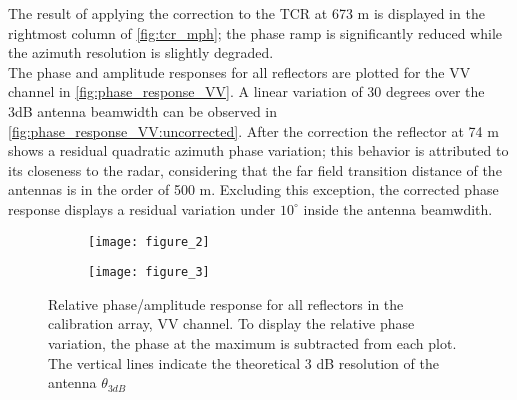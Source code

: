 The result of applying the correction to the TCR at 673 m is displayed in the rightmost column of \autoref{fig:tcr_mph}; the phase ramp is significantly reduced while the azimuth resolution is slightly degraded.\\
The phase and amplitude responses for all reflectors are plotted for the VV channel in \autoref{fig:phase_response_VV}. A linear variation of 30 degrees over the 3dB antenna beamwidth can be observed in \autoref{fig:phase_response_VV:uncorrected}. After the correction the reflector at 74 m shows a residual quadratic azimuth phase variation; this behavior is attributed to its closeness to the radar, considering that the far field transition distance of the antennas is in the order of 500 m. Excluding this exception, the corrected phase response displays a residual variation under $10^\circ$ inside the antenna beamwdith.
\begin{figure}[ht]
	\begin{subfigure}[t]{\columnwidth}
		\texttt{[image: figure\_2]}
		\label{fig:phase_response_VV:uncorrected}
	\end{subfigure}
	\begin{subfigure}[t]{\columnwidth}
		\texttt{[image: figure\_3]}
		\label{fig:phase_response_VV:corrected}
	\end{subfigure}
	\caption{Relative phase/amplitude response for all reflectors in the calibration array, VV channel. To display the relative phase variation, the phase at the maximum is subtracted from each plot. The vertical lines indicate the theoretical 3 dB resolution of the antenna $\theta_{3dB}$}
	\label{fig:phase_response_VV}
\end{figure}
